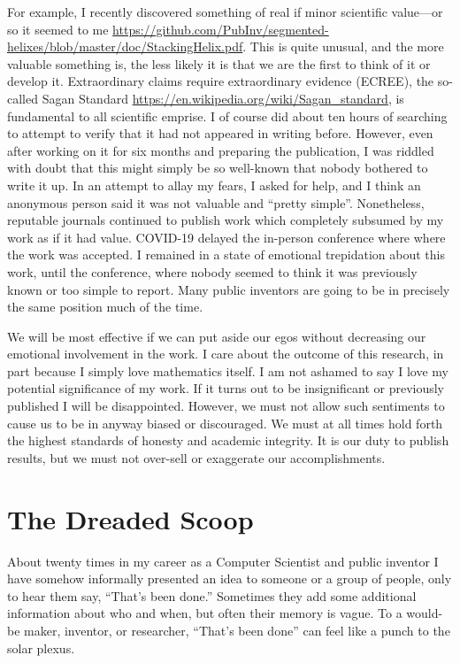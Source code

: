 \documentclass[
	fontsize=10pt, %
	twoside=false, %
	secnumdepth=1, %
]{kaobook}
\begin{document}
For example, I recently discovered something of
real if minor scientific value---or so it seemed to me \url{https://github.com/PubInv/segmented-helixes/blob/master/doc/StackingHelix.pdf}.
This is quite unusual, and the more valuable something is,
the less likely it is that we are the first to think of it
or develop it.
Extraordinary claims require extraordinary evidence (ECREE),
the so-called Sagan Standard \url{https://en.wikipedia.org/wiki/Sagan_standard},
is fundamental to all scientific emprise.
I of course did about ten hours of searching to
attempt to verify that it had not appeared in writing before.
However, even after working on it for six months and preparing
the publication, I was riddled with doubt that this might simply
be so well-known that nobody bothered to write it up.
In an attempt to allay my fears, I asked for help, and
I think an anonymous person said it was not valuable and ``pretty simple''.
Nonetheless, reputable journals continued to publish work
which completely subsumed by my work as if it had value.
COVID-19 delayed the
in-person conference where where the work was accepted.
I remained in a state of emotional trepidation about this work,
until the conference, where nobody seemed to think it was previously known
or too simple to report.
Many public inventors are going to be in precisely the
same position much of the time.

We will be most effective if we can put aside our egos
without decreasing our emotional involvement in the work.
I care about the outcome of this research, in part because
I simply love mathematics itself.
I am not ashamed to say I love my potential significance of my work. If it turns out
to be insignificant or previously published I will be disappointed.
However, we must not allow such sentiments to cause
us to be in anyway biased or discouraged.
We must at all times hold forth the highest standards
of honesty and academic integrity.
It is our duty to publish results,
but we must not over-sell or exaggerate our accomplishments.

\section{The Dreaded Scoop}

About twenty times in my career as a Computer Scientist and public
inventor I have somehow informally presented an idea to someone or a
group of people, only to hear them say, “That’s been done.”  Sometimes
they add some additional information about who and when, but often
their memory is vague.  To a would-be maker, inventor, or researcher,
“That’s been done” can feel like a punch to the solar plexus.
\end{document}
